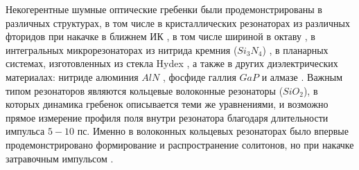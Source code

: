 Некогерентные шумные оптические гребенки были продемонстрированы в различных структурах, в том числе в кристаллических резонаторах из различных фторидов при накачке в ближнем ИК \cite{Savchenkov2008,Grudinin2012,Liang2011,Grudinin2009,Henriet:15}, в том числе шириной в октаву \cite{DelHaye2011}, в интегральных микрорезонаторах из нитрида кремния ($Si_3N_4$) \cite{Levy2010,Okawachi2011,Johnson2012,Huang2015}, в планарных системах, изготовленных из стекла Hydex \cite{Moss2013,Razzari2010}, а также в других диэлектрических материалах: нитриде алюминия $AlN$ \cite{Jung2013}, фосфиде галлия $GaP$ \cite{2018arXiv180803554W} и алмазе \cite{Hausmann2014}. Важным типом резонаторов являются кольцевые волоконные резонаторы ($SiO_2$), в которых динамика гребенок описывается теми же уравнениями, и возможно прямое измерение профиля поля внутри резонатора благодаря длительности импульса $5-10$ пс. Именно в волоконных кольцевых резонаторах было впервые продемонстрировано формирование и распространение солитонов, но при накачке затравочным импульсом \cite{Leo2010}.

